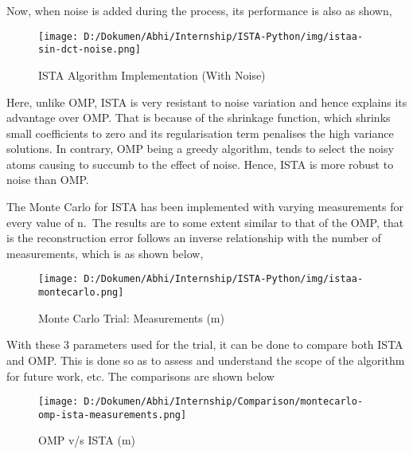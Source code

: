 \documentclass[
  letterpaper,
  DIV=11,
  numbers=noendperiod]{scrartcl}
\begin{document}
Now, when noise is added during the process, its performance is also as
shown,

\begin{figure}[H]

{\centering \texttt{[image: D:/Dokumen/Abhi/Internship/ISTA-Python/img/istaa-sin-dct-noise.png]}

}

\caption{ISTA Algorithm Implementation (With Noise)}

\end{figure}%

Here, unlike OMP, ISTA is very resistant to noise variation and hence
explains its advantage over OMP. That is because of the shrinkage
function, which shrinks small coefficients to zero and its
regularisation term penalises the high variance solutions. In contrary,
OMP being a greedy algorithm, tends to select the noisy atoms causing to
succumb to the effect of noise. Hence, ISTA is more robust to noise than
OMP.

The Monte Carlo for ISTA has been implemented with varying measurements
for every value of n.~The results are to some extent similar to that of
the OMP, that is the reconstruction error follows an inverse
relationship with the number of measurements, which is as shown below,

\begin{figure}[H]

{\centering \texttt{[image: D:/Dokumen/Abhi/Internship/ISTA-Python/img/istaa-montecarlo.png]}

}

\caption{Monte Carlo Trial: Measurements (m)}

\end{figure}%

With these 3 parameters used for the trial, it can be done to compare
both ISTA and OMP. This is done so as to assess and understand the scope
of the algorithm for future work, etc. The comparisons are shown below

\begin{figure}[H]

{\centering \texttt{[image: D:/Dokumen/Abhi/Internship/Comparison/montecarlo-omp-ista-measurements.png]}

}

\caption{OMP v/s ISTA (m)}

\end{figure}%
\end{document}
